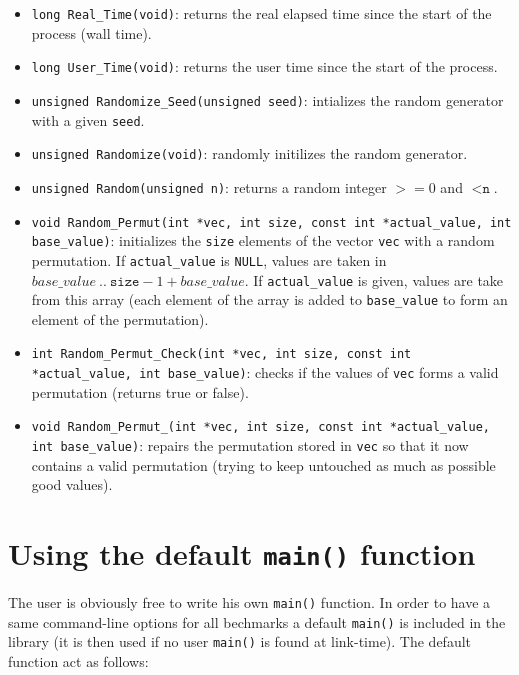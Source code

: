 \documentclass{article}
\begin{document}
\begin{itemize}

\item \texttt{long Real\_Time(void)}: returns the real elapsed time since the
  start of the process (wall time).

\item \texttt{long User\_Time(void)}: returns the user time since the start
 of the process.

\item \texttt{unsigned Randomize\_Seed(unsigned seed)}: intializes the
 random generator with a given \texttt{seed}.

\item \texttt{unsigned Randomize(void)}: randomly initilizes the random
 generator.

\item \texttt{unsigned Random(unsigned n)}: returns a random integer $>= 0$ 
 and  $< \texttt{n}$.

\item \texttt{void Random\_Permut(int *vec, int size, const int
    *actual\_value, int base\_value)}: initializes the \texttt{size} elements
  of the vector \texttt{vec} with a random permutation. If
  \texttt{actual\_value} is \texttt{NULL}, values are taken in
  $base\_value~..~\texttt{size}-1+base\_value$. If \texttt{actual\_value} is
  given, values are take from this array (each element of the array is added
  to \texttt{base\_value} to form an element of the permutation).

\item \texttt{int Random\_Permut\_Check(int *vec, int size, const int
    *actual\_value, int base\_value)}: checks if the values of \texttt{vec}
  forms a valid permutation (returns true or false).

\item \texttt{void Random\_Permut\_(int *vec, int size, const int
    *actual\_value, int base\_value)}: repairs the permutation stored in
  \texttt{vec} so that it now contains a valid permutation (trying to keep
  untouched as much as possible good values).


\end{itemize}


\section{Using the default \texttt{main()} function}

The user is obviously free to write his own \texttt{main()} function. In
order to have a same command-line options for all bechmarks a default
\texttt{main()} is included in the library (it is then used if no user
\texttt{main()} is found at link-time). The default function act as follows:
\end{document}
